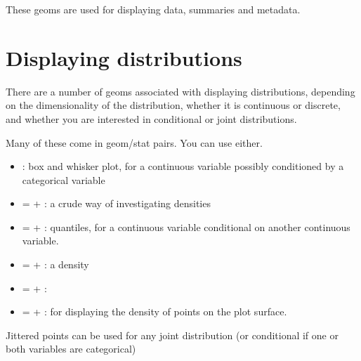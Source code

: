 These geoms are used for displaying data, summaries and metadata.

\section{Displaying distributions}\label{sec:distributions}

There are a number of geoms associated with displaying distributions, depending on the dimensionality of the distribution, whether it is continuous or discrete, and whether you are interested in conditional or joint distributions.

Many of these come in geom/stat pairs.  You can use either.  

\begin{itemize}
	\item {}: box and whisker plot, for a continuous variable possibly conditioned by a categorical variable
	\item {} =  + : a crude way of investigating densities
	\item {} =  + : quantiles, for a continuous variable conditional on another continuous variable.
	\item {} =  + : a density
	\item {} =  + : 
	\item {} =  + : for displaying the density of points on the plot surface.
\end{itemize}

% 
% 
%   
% 
% 

Jittered points can be used for any joint distribution (or conditional if one or both variables are categorical)

